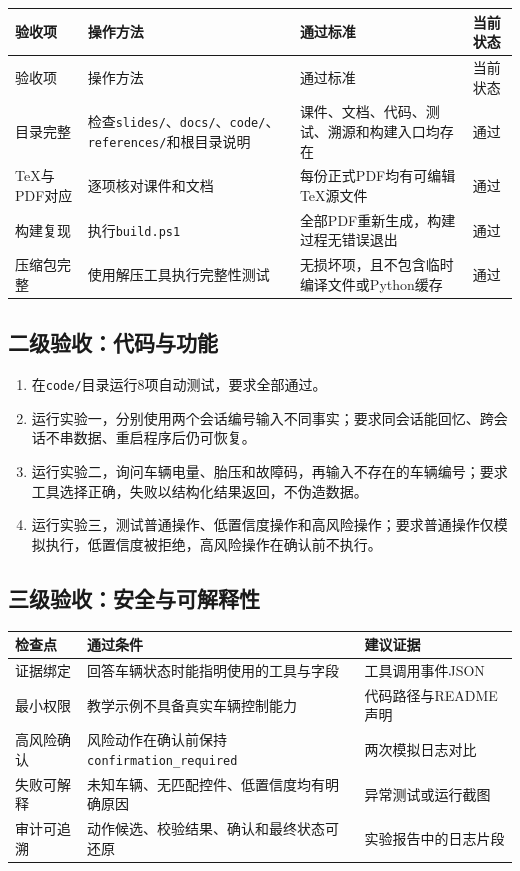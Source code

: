 \documentclass[UTF8,zihao=-4]{ctexart}
\begin{document}
\begin{longtable}{L{2.8cm} L{4.8cm} L{5.4cm} C{1.5cm}}
\toprule
验收项 & 操作方法 & 通过标准 & 当前状态\\
\midrule
\endfirsthead
\toprule
验收项 & 操作方法 & 通过标准 & 当前状态\\
\midrule
\endhead
目录完整 &
检查\texttt{slides/}、\texttt{docs/}、\texttt{code/}、\texttt{references/}和根目录说明 &
课件、文档、代码、测试、溯源和构建入口均存在 &
\textcolor{CourseTeal}{通过}\\
TeX与PDF对应 &
逐项核对课件和文档 &
每份正式PDF均有可编辑TeX源文件 &
\textcolor{CourseTeal}{通过}\\
构建复现 &
执行\texttt{build.ps1} &
全部PDF重新生成，构建过程无错误退出 &
\textcolor{CourseTeal}{通过}\\
压缩包完整 &
使用解压工具执行完整性测试 &
无损坏项，且不包含临时编译文件或Python缓存 &
\textcolor{CourseTeal}{通过}\\
\bottomrule
\end{longtable}

\subsection{二级验收：代码与功能}

\begin{enumerate}
  \item 在\texttt{code/}目录运行8项自动测试，要求全部通过。
  \item 运行实验一，分别使用两个会话编号输入不同事实；要求同会话能回忆、跨会话不串数据、重启程序后仍可恢复。
  \item 运行实验二，询问车辆电量、胎压和故障码，再输入不存在的车辆编号；要求工具选择正确，失败以结构化结果返回，不伪造数据。
  \item 运行实验三，测试普通操作、低置信度操作和高风险操作；要求普通操作仅模拟执行，低置信度被拒绝，高风险操作在确认前不执行。
\end{enumerate}

\subsection{三级验收：安全与可解释性}

\begin{table}[htbp]
\centering
\begin{tabularx}{\textwidth}{L{3.4cm} Y Y}
\toprule
检查点 & 通过条件 & 建议证据\\
\midrule
证据绑定 & 回答车辆状态时能指明使用的工具与字段 & 工具调用事件JSON\\
最小权限 & 教学示例不具备真实车辆控制能力 & 代码路径与README声明\\
高风险确认 & 风险动作在确认前保持\texttt{confirmation\_required} & 两次模拟日志对比\\
失败可解释 & 未知车辆、无匹配控件、低置信度均有明确原因 & 异常测试或运行截图\\
审计可追溯 & 动作候选、校验结果、确认和最终状态可还原 & 实验报告中的日志片段\\
\bottomrule
\end{tabularx}
\end{table}
\end{document}
